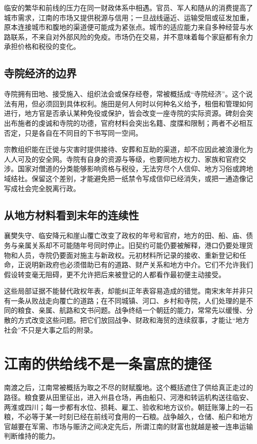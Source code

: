 临安的繁华和前线的压力在同一财政体系中相遇。官员、军人和随从的消费提高了城市需求，江南的市场又提供税源与信用；一旦战线逼近、运输受阻或征发加重，原本连接城市和腹地的渠道便可能成为紧张点。城市的适应能力来自多种经营与水路联系，不来自对外部风险的免疫。市场仍在交易，并不意味着每个家庭都有余力承担价格和税役的变化。

\subsection{寺院经济的边界}

寺院拥有田地、接受施入、组织法会或保存经卷，常被概括成“寺院经济”。这个说法有用，但必须回到具体权利。施田是何人何时以何种名义给予，租佃和管理如何进行，地方官是否承认某种免役或保护，皆会改变一座寺院的实际资源。碑刻会突出布施者的虔诚和寺院的功德，官府材料会突出名籍、度牒和限制；两者不必相互否定，只是各自在不同目的下书写同一空间。

宗教组织能在迁徙与灾害时提供接待、安葬和互助的渠道，却不应因此被浪漫化为人人可及的安全网。寺院有自身的资源与等级，也要同地方权力、家族和官府交涉。国家对僧道的分类能够影响资格与税役，无法穷尽个人信仰、地方习俗或跨地域结社。保留这个差别，才能避免把一纸禁令写成信仰已经消失，或把一通造像记写成社会完全脱离行政。

\subsection{从地方材料看到末年的连续性}

襄樊失守、临安降元和崖山覆亡改变了政权的年号和官府，地方的田、船、庙、债务与亲属关系却不可能随年号同时停止。旧契约可能仍要被解释，港口仍要处理货物和人员，寺院仍要面对施主与新政权。元初材料所记录的接收、重新登记和任命，正说明新政府也必须借助已有的道路、财产关系和地方中介。它们不允许我们假设转变毫无阻碍，更不允许把后来被登记的人都看作最初便主动接受。

这些局部证据不能替代政权年表，却能纠正年表容易造成的错觉。南宋末年并非只有一条从败战走向覆亡的道路；在不同城镇、河口、乡村和寺院，人们处理的是不同的粮食、亲属、航路和文书问题。战争终结一个朝廷的能力，常常先以缓慢、分散的方式改变这些问题。把它们放回战争、财政和海贸的连续叙事，才能让“地方社会”不只是大事之后的附录。

\section{江南的供给线不是一条富庶的捷径}

南渡之后，江南常被概括为取之不尽的财赋腹地。这个概括遮住了供给真正走过的路径。粮食要从田里征出，进入州县仓场，再由船只、河港和转运机构送往临安、两淮或四川；每一步都有水位、损耗、雇工、验收和地方议价。朝廷账簿上的一石粮，不必等于某一时刻已经在前线可食用的一石粮。战争越久，仓储、船户和地方官越要在军需、市场与赈济之间决定先后，所谓江南的财富也就越是被一连串运输判断维持的能力。

